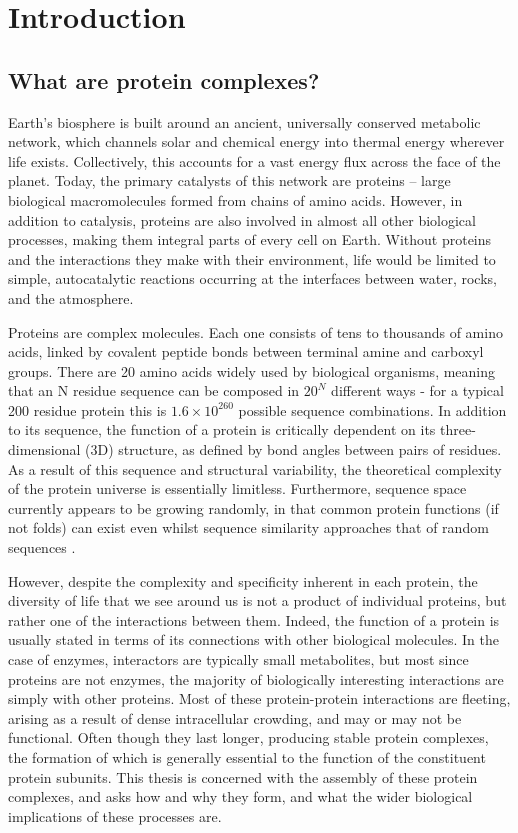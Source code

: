 \documentclass[a4paper,11pt,twoside,openright]{scrbook}
\begin{document}
\chapter{Introduction} \label{chapter:intro}

\section{What are protein complexes?}
Earth’s biosphere is built around an ancient, universally conserved metabolic network, which channels solar and chemical energy into thermal energy wherever life exists. Collectively, this accounts for a vast energy flux across the face of the planet. Today, the primary catalysts of this network are proteins – large biological macromolecules formed from chains of amino acids. However, in addition to catalysis, proteins are also involved in almost all other biological processes, making them integral parts of every cell on Earth. Without proteins and the interactions they make with their environment, life would be limited to simple, autocatalytic reactions occurring at the interfaces between water, rocks, and the atmosphere.

Proteins are complex molecules. Each one consists of tens to thousands of amino acids, linked by covalent peptide bonds between terminal amine and carboxyl groups. There are 20 amino acids widely used by biological organisms, meaning that an N residue sequence can be composed in \(20^{N}\) different ways - for a typical 200 residue protein this is \(1.6 \times 10^{260}\) possible sequence combinations. In addition to its sequence, the function of a protein is critically dependent on its three-dimensional (3D) structure, as defined by bond angles between pairs of residues. As a result of this sequence and structural variability, the theoretical complexity of the protein universe is essentially limitless. Furthermore, sequence space currently appears to be growing randomly, in that common protein functions (if not folds) can exist even whilst sequence similarity approaches that of random sequences \cite{Larson2002,Povolotskaya2010}.

However, despite the complexity and specificity inherent in each protein, the diversity of life that we see around us is not a product of individual proteins, but rather one of the interactions between them. Indeed, the function of a protein is usually stated in terms of its connections with other biological molecules. In the case of enzymes, interactors are typically small metabolites, but most since proteins are not enzymes, the majority of biologically interesting interactions are simply with other proteins. Most of these protein-protein interactions are fleeting, arising as a result of dense intracellular crowding, and may or may not be functional. Often though they last longer, producing stable protein complexes, the formation of which is generally essential to the function of the constituent protein subunits. This thesis is concerned with the assembly of these protein complexes, and asks how and why they form, and what the wider biological implications of these processes are.
\end{document}
